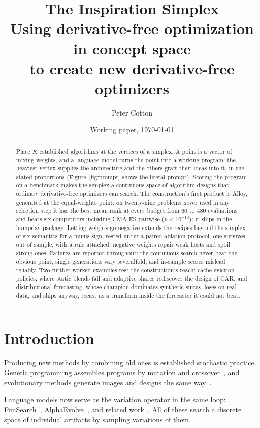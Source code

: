 \documentclass[11pt]{article}
\title{The Inspiration Simplex\\[0.4em]
\large Using derivative-free optimization in concept space\\
to create new derivative-free optimizers}
\author{Peter Cotton}
\date{Working paper, \today}
\begin{document}
\maketitle

\begin{abstract}
\noindent Place $K$ established algorithms at the vertices of a simplex. A
point is a vector of mixing weights, and a language model turns the point
into a working program: the heaviest vertex supplies the architecture and
the others graft their ideas into it, in the stated proportions
(Figure~\ref{fig:prompt} shows the literal prompt). Scoring the program on
a benchmark makes the simplex a continuous space of algorithm designs that
ordinary derivative-free optimizers can search. The construction's first
product is Alloy, generated at the equal-weights point: on twenty-nine
problems never used in any selection step it has the best mean rank at
every budget from 60 to 480 evaluations and beats six competitors including
CMA-ES pairwise ($p < 10^{-10}$); it ships in the humpday package. Letting
weights go negative extends the recipes beyond the simplex; of six
semantics for a minus sign, tested under a paired-ablation protocol, one
survives out of sample, with a rule attached: negative weights repair weak
hosts and spoil strong ones. Failures are reported throughout: the
continuous search never beat the obvious point, single generations vary
severalfold, and in-sample scores mislead reliably. Two further worked
examples test the construction's reach: cache-eviction policies, where
static blends fail and adaptive shares rediscover the design of CAR, and
distributional forecasting, whose champion dominates synthetic suites,
loses on real data, and ships anyway, recast as a transform inside the
forecaster it could not beat.
\end{abstract}

\section{Introduction}

Producing new methods by combining old ones is established stochastic
practice. Genetic programming assembles programs by mutation and
crossover~\cite{koza1992}, and evolutionary methods generate images and
designs the same way~\cite{sims1991}.

Language models now serve as the variation operator in the same loop:
FunSearch~\cite{funsearch2024}, AlphaEvolve~\cite{alphaevolve2025}, and
related work~\cite{lehman2022,meyerson2023}. All of these search a discrete
space of individual artifacts by sampling variations of them.
\end{document}

